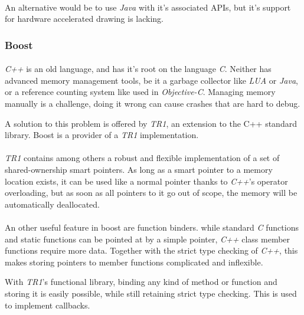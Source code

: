 \paragraph{}
An alternative would be to use \textit{Java} with it's associated APIs, but it's support for hardware accelerated drawing is lacking.


\subsubsection{Boost}
\paragraph{}
\textit{C++} is an old language, and has it's root on the language \textit{C}.
Neither has advanced memory management tools, be it a garbage collector like \textit{LUA} or \textit{Java}, or a reference counting system like used in \textit{Objective-C}.
Managing memory manually is a challenge, doing it wrong can cause crashes that are hard to debug.

A solution to this problem is offered by \textit{TR1}, an extension to the C++ standard library.
Boost\cite{boost} is a provider of a \textit{TR1} implementation.

\paragraph{}
\textit{TR1} contains among others a robust and flexible implementation of a set of shared-ownership smart pointers.
As long as a smart pointer to a memory location exists, it can be used like a normal pointer thanks to \textit{C++}'s operator overloading,
but as soon as all pointers to it go out of scope, the memory will be automatically deallocated.

\paragraph{}
An other useful feature in boost are function binders.
while standard \textit{C} functions and static functions can be pointed at by a simple pointer,
\textit{C++} class member functions require more data.
Together with the strict type checking of \textit{C++}, this makes storing pointers to member functions complicated and inflexible.

With \textit{TR1}'s functional library, binding any kind of method or function and storing it is easily possible, while still retaining strict type checking.
This is used to implement callbacks.



